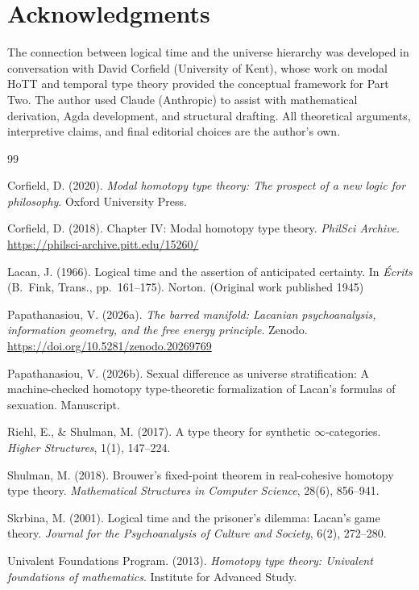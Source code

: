 \documentclass[12pt]{article}
\theoremstyle{definition}
\theoremstyle{remark}
\begin{document}
\section*{Acknowledgments}

The connection between logical time and the universe hierarchy was developed in conversation with David Corfield (University of Kent), whose work on modal HoTT and temporal type theory provided the conceptual framework for Part Two. The author used Claude (Anthropic) to assist with mathematical derivation, Agda development, and structural drafting. All theoretical arguments, interpretive claims, and final editorial choices are the author's own.

\begin{thebibliography}{99}

Corfield, D. (2020). \textit{Modal homotopy type theory: The prospect of a new logic for philosophy}. Oxford University Press.

Corfield, D. (2018). Chapter IV: Modal homotopy type theory. \textit{PhilSci Archive}. \url{https://philsci-archive.pitt.edu/15260/}

Lacan, J. (1966). Logical time and the assertion of anticipated certainty. In \textit{\'{E}crits} (B.~Fink, Trans., pp.~161--175). Norton. (Original work published 1945)

Papathanasiou, V. (2026a). \textit{The barred manifold: Lacanian psychoanalysis, information geometry, and the free energy principle}. Zenodo. \url{https://doi.org/10.5281/zenodo.20269769}

Papathanasiou, V. (2026b). Sexual difference as universe stratification: A machine-checked homotopy type-theoretic formalization of Lacan's formulas of sexuation. Manuscript.

Riehl, E., \& Shulman, M. (2017). A type theory for synthetic $\infty$-categories. \textit{Higher Structures}, 1(1), 147--224.

Shulman, M. (2018). Brouwer's fixed-point theorem in real-cohesive homotopy type theory. \textit{Mathematical Structures in Computer Science}, 28(6), 856--941.

Skrbina, M. (2001). Logical time and the prisoner's dilemma: Lacan's game theory. \textit{Journal for the Psychoanalysis of Culture and Society}, 6(2), 272--280.

Univalent Foundations Program. (2013). \textit{Homotopy type theory: Univalent foundations of mathematics}. Institute for Advanced Study.

\end{thebibliography}
\end{document}
